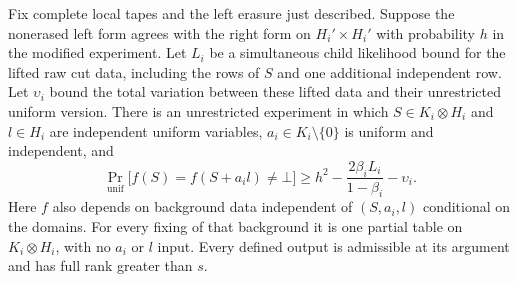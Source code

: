 \begin{lemma}\label{lem:resampling}
Fix complete local tapes and the left erasure just described.  Suppose
the nonerased left form agrees with the right form on $H_i'\times H_i'$
with probability $h$ in the modified experiment.  Let $L_i$ be a
simultaneous child likelihood bound for the lifted raw cut data,
including the rows of $S$ and one additional independent row.  Let
$\upsilon_i$ bound the total variation between these lifted data and
their unrestricted uniform version.  There is an unrestricted
experiment in which $S\in K_i\otimes H_i$ and $l\in H_i$ are independent
uniform variables, $a_i\in K_i\setminus\{0\}$ is uniform and independent,
and
\begin{equation}\label{eq:lower-full-equality}
 \Pr_{\mathrm{unif}}\bigl[
 f(S)=f(S+a_i l)\ne\bot\bigr]
 \geq h^2-\frac{2\beta_i L_i}{1-\beta_i}-\upsilon_i.
\end{equation}
Here $f$ also depends on background data independent of $(S,a_i,l)$
conditional on the domains.  For every fixing of that background it is
one partial table on $K_i\otimes H_i$, with no $a_i$ or $l$ input.  Every
defined output is admissible at its argument and has full rank greater
than $s$.
\end{lemma}

